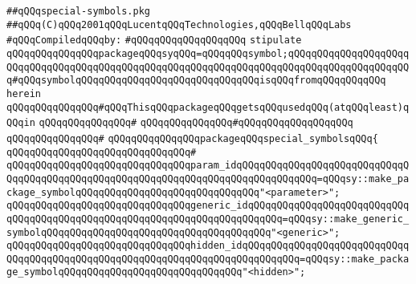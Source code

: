 \label{src/lib/compiler/front/typer/main/special-symbols.pkg}
\verb|##qQQqspecial-symbols.pkg|\newline
\verb|##qQQq(C)qQQq2001qQQqLucentqQQqTechnologies,qQQqBellqQQqLabs|\newline
\newline
\verb|#qQQqCompiledqQQqby:|\newline
\verb|#qQQqqQQqqQQqqQQqqQQq|\newline
\newline
\verb|stipulate|\newline
\verb|qQQqqQQqqQQqqQQqpackageqQQqsyqQQq=qQQqqQQqsymbol;qQQqqQQqqQQqqQQqqQQqqQQqqQQqqQQqqQQqqQQqqQQqqQQqqQQqqQQqqQQqqQQqqQQqqQQqqQQqqQQqqQQqqQQqqQQq#qQQqsymbolqQQqqQQqqQQqqQQqqQQqqQQqqQQqqQQqisqQQqfromqQQqqQQqqQQq|\newline
\verb|herein|\newline
\newline
\verb|qQQqqQQqqQQqqQQq#qQQqThisqQQqpackageqQQqgetsqQQqusedqQQq(atqQQqleast)qQQqin|\newline
\verb|qQQqqQQqqQQqqQQq#|\newline
\verb|qQQqqQQqqQQqqQQq#qQQqqQQqqQQqqQQqqQQq|\newline
\verb|qQQqqQQqqQQqqQQq#|\newline
\verb|qQQqqQQqqQQqqQQqpackageqQQqspecial_symbolsqQQq{|\newline
\verb|qQQqqQQqqQQqqQQqqQQqqQQqqQQqqQQq#|\newline
\verb|qQQqqQQqqQQqqQQqqQQqqQQqqQQqqQQqparam_idqQQqqQQqqQQqqQQqqQQqqQQqqQQqqQQqqQQqqQQqqQQqqQQqqQQqqQQqqQQqqQQqqQQqqQQqqQQqqQQqqQQq=qQQqsy::make_package_symbolqQQqqQQqqQQqqQQqqQQqqQQqqQQqqQQq"<parameter>";|\newline
\verb|qQQqqQQqqQQqqQQqqQQqqQQqqQQqqQQqgeneric_idqQQqqQQqqQQqqQQqqQQqqQQqqQQqqQQqqQQqqQQqqQQqqQQqqQQqqQQqqQQqqQQqqQQqqQQqqQQq=qQQqsy::make_generic_symbolqQQqqQQqqQQqqQQqqQQqqQQqqQQqqQQqqQQqqQQq"<generic>";|\newline
\verb|qQQqqQQqqQQqqQQqqQQqqQQqqQQqqQQqhidden_idqQQqqQQqqQQqqQQqqQQqqQQqqQQqqQQqqQQqqQQqqQQqqQQqqQQqqQQqqQQqqQQqqQQqqQQqqQQqqQQq=qQQqsy::make_package_symbolqQQqqQQqqQQqqQQqqQQqqQQqqQQqqQQq"<hidden>";|\newline
